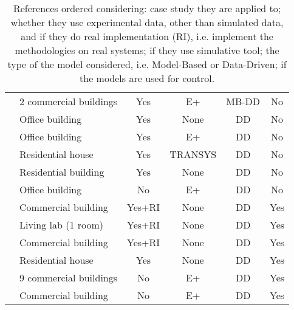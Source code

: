 {\begin{table}[t!]
{\begin{tabular}{llcccc}
		\cite{Li2016AE}                  & 2 commercial buildings  & Yes                 & E+                  & MB-DD             & No                \\
		\cite{Safa2017SCS}               & Office building         & Yes                 & None                & DD                & No                \\
		\cite{Neto2008EB}                & Office building         & Yes                 & E+                  & DD                & No                \\
		\cite{Magnier2010BE}             & Residential house       & Yes                 & TRANSYS             & DD                & No                \\
		\cite{Candanedo2017EB}           & Residential building    & Yes                 & None                & DD                & No                \\
		\cite{Ascione2017E}              & Office building         & No                  & E+                  & DD                & No                \\
		\cite{Macarulla2017}             & Commercial building     & Yes+RI              & None                & DD                & Yes               \\
		\cite{Costanzo2016}              & Living lab (1 room)     & Yes+RI              & None                & DD                & Yes               \\
		\cite{Ferreira2012}              & Commercial building     & Yes+RI              & None                & DD                & Yes               \\
		\cite{Afram2017}                 & Residential house       & Yes                 & None                & DD                & Yes               \\
		\cite{Behl2016}                  & 9 commercial buildings  & No                  & E+                  & DD                & Yes               \\
		\cite{Jain2017TCPS}              & Commercial building     & No                  & E+                  & DD                & Yes               \\
		\bottomrule
	\end{tabular}\normalsize}
	\caption{\textcolor[rgb]{0,0,1}{References ordered considering: case study they are applied to; whether they use experimental data, other than simulated data, and if they do real implementation (RI), i.e. implement the methodologies on real systems; if they use simulative tool; the type of the model considered, i.e. Model-Based or Data-Driven; if the models are used for control.}}
	\captionsetup{justification=centering}
	\label{T:RelatedWork}
\end{table}
}

